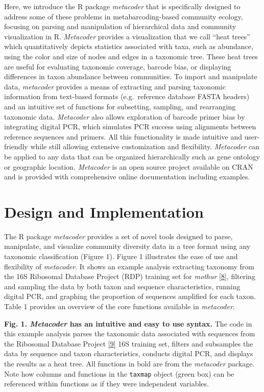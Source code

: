 \documentclass[10pt,letterpaper]{article}
\begin{document}
Here, we introduce the R package \emph{metacoder} that is specifically
designed to address some of these problems in metabarcoding-based
community ecology, focusing on parsing and manipulation of hierarchical
data and community visualization in R. \emph{Metacoder} provides a
visualization that we call ``heat trees'' which quantitatively depicts
statistics associated with taxa, such as abundance, using the color and
size of nodes and edges in a taxonomic tree. These heat trees are useful
for evaluating taxonomic coverage, barcode bias, or displaying
differences in taxon abundance between communities. To import and
manipulate data, \emph{metacoder} provides a means of extracting and
parsing taxonomic information from text-based formats (e.g.~reference
database FASTA headers) and an intuitive set of functions for
subsetting, sampling, and rearranging taxonomic data. \emph{Metacoder}
also allows exploration of barcode primer bias by integrating digital
PCR, which simulates PCR success using alignments between reference
sequences and primers. All this functionality is made intuitive and
user-friendly while still allowing extensive customization and
flexibility. \emph{Metacoder} can be applied to any data that can be
organized hierarchically such as gene ontology or geographic location.
\emph{Metacoder} is an open source project available on CRAN and is
provided with comprehensive online documentation including examples.


\section*{Design and Implementation}\label{design-and-implementation}

The R package \emph{metacoder} provides a set of novel tools designed to
parse, manipulate, and visualize community diversity data in a tree
format using any taxonomic classification (Figure 1). Figure 1
illustrates the ease of use and flexibility of \emph{metacoder}. It
shows an example analysis extracting taxonomy from the 16S Ribosomal
Database Project (RDP) training set for \emph{mothur}
\hyperref[csl:8]{[8]}, filtering and sampling the data by both
taxon and sequence characteristics, running digital PCR, and graphing
the proportion of sequences amplified for each taxon. Table 1 provides
an overview of the core functions available in \emph{metacoder}.

\textbf{Fig. 1. \emph{Metacoder} has an intuitive and easy to use
syntax.} The code in this example analysis parses the taxonomic data
associated with sequences from the Ribosomal Database Project
\hyperref[csl:9]{[9]} 16S training set, filters and subsamples the
data by sequence and taxon characteristics, conducts digital PCR, and
displays the results as a heat tree. All functions in bold are from the
\emph{metacoder} package. Note how columns and functions in the
\texttt{taxmap} object (green box) can be referenced within functions as
if they were independent variables.
\end{document}
